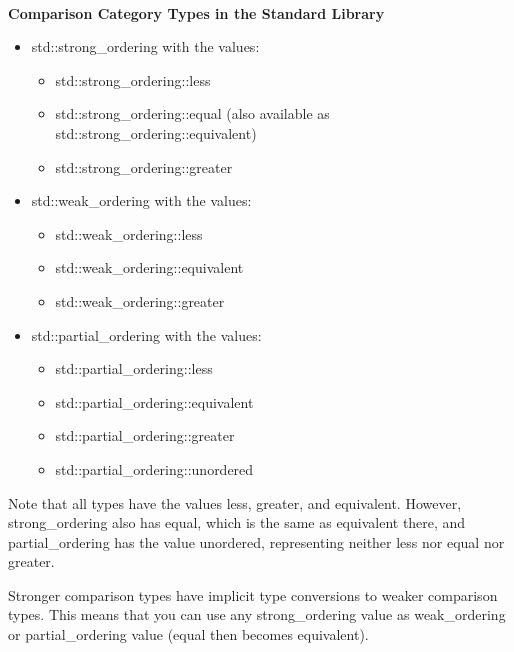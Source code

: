 \noindent
\hspace*{\fill} \\ %
\textbf{Comparison Category Types in the Standard Library}

\begin{itemize}
\item
std::strong\_ordering with the values:
\begin{itemize}
\item
std::strong\_ordering::less

\item
std::strong\_ordering::equal (also available as std::strong\_ordering::equivalent)

\item
std::strong\_ordering::greater
\end{itemize}

\item
std::weak\_ordering with the values:
\begin{itemize}
\item
std::weak\_ordering::less

\item
std::weak\_ordering::equivalent

\item
std::weak\_ordering::greater
\end{itemize}

\item
std::partial\_ordering with the values:
\begin{itemize}
\item
std::partial\_ordering::less

\item
std::partial\_ordering::equivalent

\item
std::partial\_ordering::greater

\item
std::partial\_ordering::unordered
\end{itemize}
\end{itemize}

Note that all types have the values less, greater, and equivalent. However, strong\_ordering also has equal, which is the same as equivalent there, and partial\_ordering has the value unordered, representing neither less nor equal nor greater.

Stronger comparison types have implicit type conversions to weaker comparison types. This means that you can use any strong\_ordering value as weak\_ordering or partial\_ordering value (equal then becomes equivalent).

